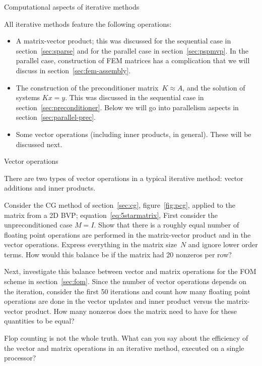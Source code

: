  {Computational aspects of iterative methods}
\label{sec:iterative-computational}

All iterative methods feature the following operations:
\begin{itemize}
\item A matrix-vector product; this was discussed for the sequential
  case in section~\ref{sec:sparse} and for the parallel case in
  section~\ref{sec:pspmvp}.
  In the parallel case,
  construction of \ac{FEM} matrices has a complication that we will
  discuss in section~\ref{sec:fem-assembly}.
\item The construction of the preconditioner matrix~$K\approx A$, and
  the solution of systems $Kx=y$. This was discussed in the sequential
  case in section~\ref{sec:preconditioner}. Below
  we will go into parallelism aspects in section~\ref{sec:parallel-prec}.
\item Some vector operations (including inner products, in
  general). These will be discussed next.
\end{itemize}

 {Vector operations}

There are two types of vector operations in a typical iterative method:
vector additions and inner products. 

\begin{exercise}
  Consider the \ac{CG} method of section~\ref{sec:cg},
  figure~\ref{fig:pcg}, applied to the
  matrix from a 2D \ac{BVP}; equation~\eqref{eq:5starmatrix}, First
  consider the unpreconditioned case $M=I$. Show that there is a
  roughly equal number of floating point
  operations are performed in the matrix-vector product and 
  in the vector operations. Express everything in the matrix size~$N$ and
  ignore lower order terms. How would this balance be if the matrix
  had 20 nonzeros per row?

  Next, investigate this balance between vector and matrix operations
  for the \ac{FOM} scheme in section~\ref{sec:fom}. Since the number
  of vector operations depends on the iteration, consider the first 50
  iterations and count how many floating point operations are done in
  the vector updates and inner product versus the matrix-vector
  product. How many nonzeros does the matrix need to have for these
  quantities to be equal?
\end{exercise}

\begin{exercise}
  Flop counting is not the whole truth. What can you say about the
  efficiency of the vector and matrix operations in an iterative
  method, executed on a single processor?
\end{exercise}

